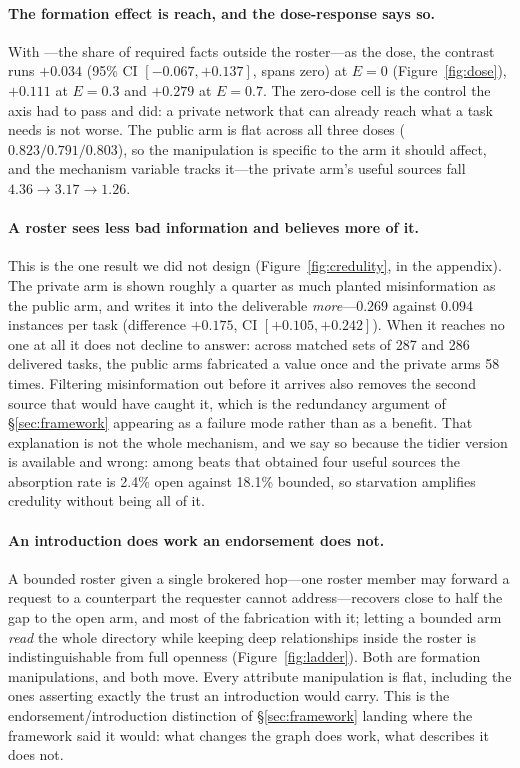

\paragraph{The formation effect is reach, and the dose-response says so.} With
---the share of required facts outside the roster---as the dose, the contrast runs
$+0.034$ (95\% CI $[-0.067, +0.137]$, spans zero) at $E=0$ (Figure~\ref{fig:dose}), $+0.111$
at $E = 0.3$ and $+0.279$ at $E = 0.7$. The zero-dose cell is the control the axis had to
pass and did: a private network that can already reach what a task needs is not worse. The
public arm is flat across all three doses ($0.823 / 0.791 / 0.803$), so the manipulation is
specific to the arm it should affect, and the mechanism variable tracks it---the private
arm's useful sources fall $4.36 \to 3.17 \to 1.26$.

\paragraph{A roster sees less bad information and believes more of it.} This is the one
result we did not design (Figure~\ref{fig:credulity}, in the appendix). The private arm is shown roughly a
quarter as much planted misinformation as the public arm, and writes it into the deliverable
\emph{more}---$0.269$ against $0.094$ instances per task (difference $+0.175$, CI
$[+0.105, +0.242]$). When it reaches no one at all it does not decline to answer: across
matched sets of 287 and 286 delivered tasks, the public arms fabricated a value once and the
private arms 58 times. Filtering misinformation out before it arrives also removes the
second source that would have caught it, which is the redundancy argument of
\S\ref{sec:framework} appearing as a failure mode rather than as a benefit. That explanation
is not the whole mechanism, and we say so because the tidier version is available and wrong:
among beats that obtained four useful sources the absorption rate is 2.4\% open against
18.1\% bounded, so starvation amplifies credulity without being all of it.

\ifcompact\else\fi

\paragraph{An introduction does work an endorsement does not.} A bounded roster given a
single brokered hop---one roster member may forward a request to a counterpart the requester
cannot address---recovers close to half the gap to the open arm, and most of the fabrication
with it; letting a bounded arm \emph{read} the whole directory while keeping deep
relationships inside the roster is indistinguishable from full openness
(Figure~\ref{fig:ladder}). Both are formation manipulations, and both move. Every attribute
manipulation is flat, including the ones asserting exactly the trust an introduction would
carry. This is the endorsement/introduction distinction of \S\ref{sec:framework} landing
where the framework said it would: what changes the graph does work, what describes it does
not.

